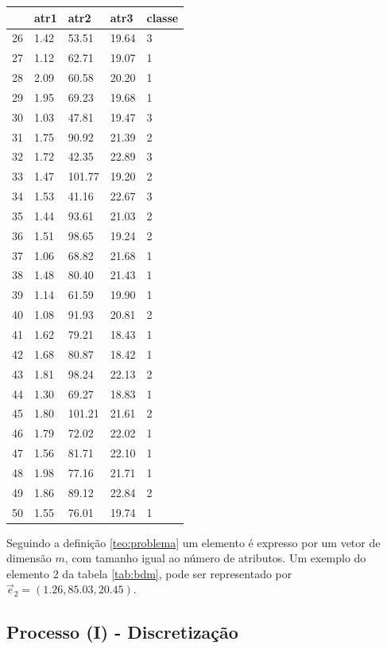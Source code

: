 \begin{table}[!ht]
\begin{tabular}{ |lllll| }
\hline
  & atr1 & atr2 & atr3 & classe \\ \hline
26 & 1.42 & 53.51 & 19.64 & 3 \\ \hline
27 & 1.12 & 62.71 & 19.07 & 1 \\ \hline
28 & 2.09 & 60.58 & 20.20 & 1 \\ \hline
29 & 1.95 & 69.23 & 19.68 & 1 \\ \hline
30 & 1.03 & 47.81 & 19.47 & 3 \\ \hline
31 & 1.75 & 90.92 & 21.39 & 2 \\ \hline
32 & 1.72 & 42.35 & 22.89 & 3 \\ \hline
33 & 1.47 & 101.77 & 19.20 & 2 \\ \hline
34 & 1.53 & 41.16 & 22.67 & 3 \\ \hline
35 & 1.44 & 93.61 & 21.03 & 2 \\ \hline
36 & 1.51 & 98.65 & 19.24 & 2 \\ \hline
37 & 1.06 & 68.82 & 21.68 & 1 \\ \hline
38 & 1.48 & 80.40 & 21.43 & 1 \\ \hline
39 & 1.14 & 61.59 & 19.90 & 1 \\ \hline
40 & 1.08 & 91.93 & 20.81 & 2 \\ \hline
41 & 1.62 & 79.21 & 18.43 & 1 \\ \hline
42 & 1.68 & 80.87 & 18.42 & 1 \\ \hline
43 & 1.81 & 98.24 & 22.13 & 2 \\ \hline
44 & 1.30 & 69.27 & 18.83 & 1 \\ \hline
45 & 1.80 & 101.21 & 21.61 & 2 \\ \hline
46 & 1.79 & 72.02 & 22.02 & 1 \\ \hline
47 & 1.56 & 81.71 & 22.10 & 1 \\ \hline
48 & 1.98 & 77.16 & 21.71 & 1 \\ \hline
49 & 1.86 & 89.12 & 22.84 & 2 \\ \hline
50 & 1.55 & 76.01 & 19.74 & 1 \\ \hline
\end{tabular}
\end{table}

Seguindo a definição \ref{teo:problema} um elemento é expresso por um vetor  de dimensão ${m}$, com tamanho igual ao número de atributos. Um exemplo do elemento 2 da tabela \ref{tab:bdm}, pode ser representado por ${\vec{e}_{2}=(1.26,85.03, 20.45)}$.

\subsection{Processo (I) - Discretização} \label{cap:ferramentas:ssec:disc}

